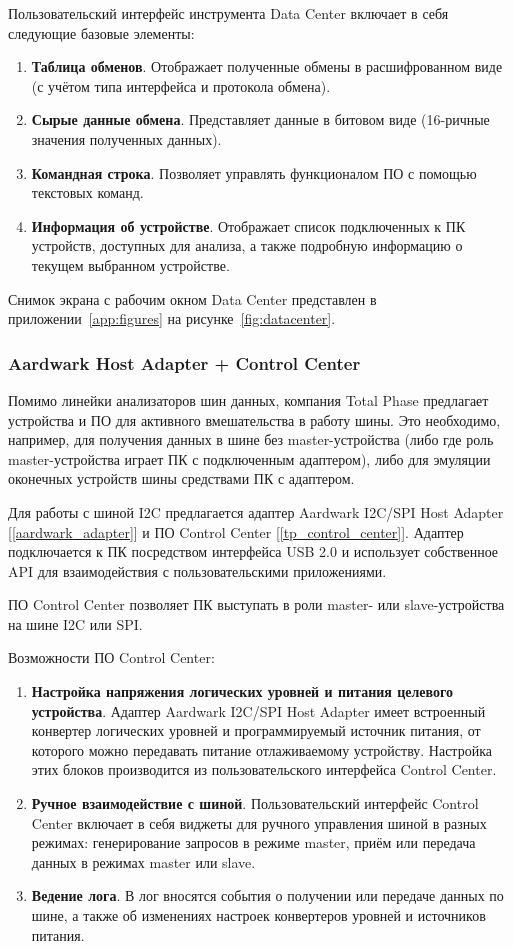 Пользовательский интерфейс инструмента Data Center включает в себя следующие базовые элементы:

\begin{enumerate}
 \item \textbf{Таблица обменов}. Отображает полученные обмены в расшифрованном виде (с учётом типа интерфейса и протокола обмена).
 \item \textbf{Сырые данные обмена}. Представляет данные в битовом виде (16-ричные значения полученных данных).
 \item \textbf{Командная строка}. Позволяет управлять функционалом ПО с помощью текстовых команд.
 \item \textbf{Информация об устройстве}. Отображает список подключенных к ПК устройств, доступных для анализа, а также подробную информацию о текущем выбранном устройстве.
\end{enumerate}

Снимок экрана с рабочим окном Data Center представлен в приложении~\ref{app:figures} на рисунке~\ref{fig:datacenter}.

\subsubsection{Aardwark Host Adapter + Control Center}

Помимо линейки анализаторов шин данных, компания Total Phase предлагает устройства и ПО для активного вмешательства в работу шины. Это необходимо, например, для получения данных в шине без master-устройства (либо где роль master-устройства играет ПК с подключенным адаптером), либо для эмуляции оконечных устройств шины средствами ПК с адаптером.

Для работы с шиной I2C предлагается адаптер Aardwark I2C/SPI Host Adapter [\ref{aardwark_adapter}] и ПО Control Center [\ref{tp_control_center}]. Адаптер подключается к ПК посредством интерфейса USB 2.0 и использует собственное API для взаимодействия с пользовательскими приложениями.

ПО Control Center позволяет ПК выступать в роли master- или slave-устройства на шине I2C или SPI.

Возможности ПО Control Center:

\begin{enumerate}
 \item \textbf{Настройка напряжения логических уровней и питания целевого устройства}. Адаптер Aardwark I2C/SPI Host Adapter имеет встроенный конвертер логических уровней и программируемый источник питания, от которого можно передавать питание отлаживаемому устройству. Настройка этих блоков производится из пользовательского интерфейса Control Center.
 \item \textbf{Ручное взаимодействие с шиной}. Пользовательский интерфейс Control Center включает в себя виджеты для ручного управления шиной в разных режимах: генерирование запросов в режиме master, приём или передача данных в режимах master или slave.
 \item \textbf{Ведение лога}. В лог вносятся события о получении или передаче данных по шине, а также об изменениях настроек конвертеров уровней и источников питания.
\end{enumerate}

